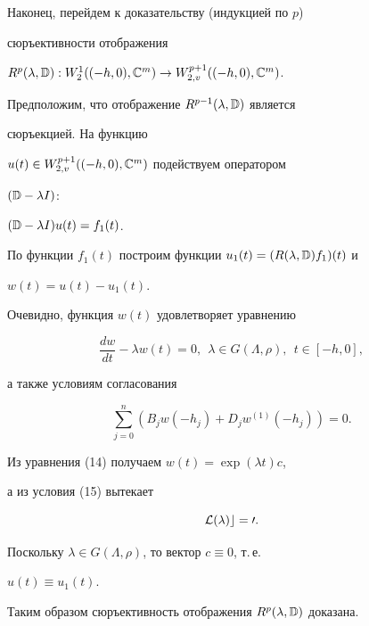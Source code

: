 \begin{pf}
Наконец, перейдем к доказательству (индукцией по $p$) 


сюръективности отображения 


$R^p(\lambda,\Bbb D):W^1_2((-h,0),\Bbb C^m)\to 


W^{p+1}_{2,v}((-h,0),\Bbb C^m)$. 


 


Предположим, что отображение $R^{p-1}(\lambda,\Bbb D)$ является 


сюръекцией. На функцию 


$u(t)\in\linebreak W^{p+1}_{2,v}((-h,0),\Bbb C^m)$ подействуем оператором 


$(\Bbb D-\lambda I)$: 


$(\Bbb D-\lambda I)u(t)=f_1(t)$. 


По функции $f_1(t)$ построим функции $u_1(t)=(R(\lambda,\Bbb D)f_1)(t)$ и 


$w(t)=u(t)-u_1(t)$. 


Очевидно, функция $w(t)$ удовлетворяет уравнению 


\begin{equation} 


\frac{d w}{d t}-\lambda w(t)=0,\ \ \lambda\in G(\Lambda,\rho), 


\ \ t\in [-h,0], 


\end{equation} 


а также условиям согласования 


\begin{equation} 


\sum^n_{j=0}(B_j w(-h_j)+D_j w^{(1)}(-h_j))=0. 


\end{equation} 


Из уравнения (14) получаем $w(t)=\exp(\lambda t)c$, 


а из условия (15) вытекает


\begin{equation} 


\cal L(\lambda)c=0. 


\end{equation} 


Поскольку $\lambda\in G(\Lambda,\rho)$, то вектор $c\equiv0$, т.\,е. 


$u(t)\equiv u_1(t)$. 


 


Таким образом сюръективность отображения $R^p(\lambda,\Bbb D)$ доказана. 


\end{pf} 


